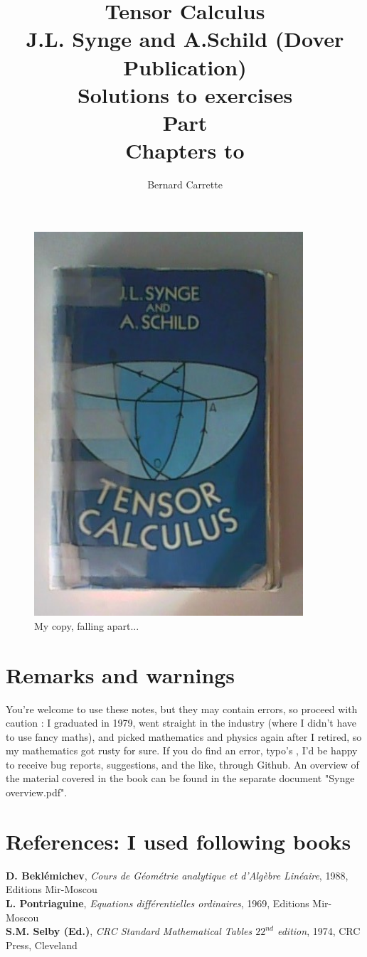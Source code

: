 \documentclass{thesis}
\author{Bernard Carrette}
\title{Tensor Calculus\\J.L. Synge and A.Schild (Dover Publication)\\ Solutions to exercises\\Part \RomanNumeralCaps{1}\\
Chapters \RomanNumeralCaps{1} to \RomanNumeralCaps{4}}
\begin{document}
\maketitle
\begin{figure}%
  \centering
  \includegraphics[width=10cm]{./images/zebook.jpg}
  \caption{My copy, falling apart...}
  \label{fig:test}
\end{figure}

\section*{Remarks and warnings}
You're welcome to use these notes, but they may contain errors, so proceed with caution : I graduated in 1979, went straight in the industry (where I didn't have to use fancy maths), and picked mathematics and physics again after I retired, so my mathematics got rusty  for sure. If you do find an error, typo's , I'd be happy to receive bug reports, suggestions, and the like, through Github.
An overview of the material covered in the book can be found in the separate document "Synge overview.pdf".
\newpage

\section*{References: I used following books}
\textbf{D. Beklémichev}, \textit{Cours de Géométrie analytique et d'Algèbre Linéaire}, 1988, Editions Mir-Moscou\\
\textbf{L. Pontriaguine}, \textit{Equations différentielles ordinaires}, 1969, Editions Mir-Moscou\\
\textbf{S.M. Selby (Ed.)}, \textit{CRC Standard Mathematical Tables $22^{nd}$ edition}, 1974, CRC Press, Cleveland \\
\end{document}
